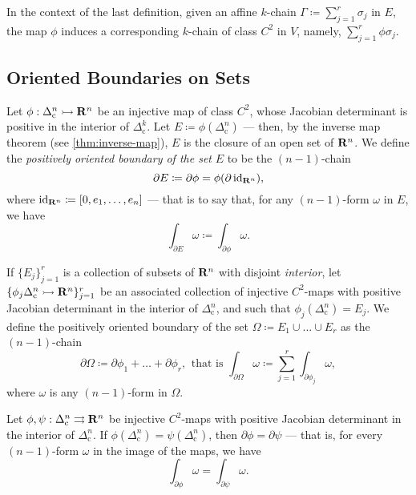 In the context of the last definition, given an affine \(k\)-chain \(\Gamma
\coloneq \sum_{j=1}^r \sigma_j\) in \(E\), the map \(\phi\) induces a
corresponding \(k\)-chain of class \(C^2\) in \(V\), namely, \(\sum_{j=1}^r \phi
\sigma_j\).

\subsection{Oriented Boundaries on Sets}

\begin{definition}
    \label{def:positively-oriented-boundary-on-sets}
    Let \(\phi: \Delta_{\text{c}}^n \rightarrowtail \mathbf{R}^n\) be an injective map of class
    \(C^2\), whose Jacobian determinant is positive in the interior of
    \(\Delta_{\text{c}}^k\). Let \(E \coloneq \phi(\Delta_{\text{c}}^n)\) --- then,
    by the inverse map theorem (see \cref{thm:inverse-map}), \(E\) is the closure of
    an open set of \(\mathbf{R}^n\). We define the \emph{positively oriented boundary of
        the set} \(E\) to be the \((n-1)\)-chain
    \[
        \partial E \coloneq \partial \phi = \phi(\partial \operatorname{id}_{\mathbf{R}^n}),
    \]
    where \(\operatorname{id}_{\mathbf{R}^n} \coloneq [0, e_1, \dots, e_n]\) --- that is to say that, for
    any \((n-1)\)-form \(\omega\) in \(E\), we have
    \[
        \int_{\partial E} \omega \coloneq \int_{\partial \phi} \omega.
    \]

    If \(\{E_{j}\}_{j=1}^r\) is a collection of subsets of \(\mathbf{R}^n\) with disjoint
    \emph{interior}, let
    \(\{\phi_{j} \relax \Delta_{\text{c}}^n \rightarrowtail \mathbf{R}^n\}_{j=1}^r\) be an associated
    collection of injective \(C^2\)-maps with positive Jacobian determinant in the
    interior of \(\Delta_{\text{c}}^n\), and such that
    \(\phi_j(\Delta_{\text{c}}^n) = E_j\). We define the positively oriented
    boundary of the set \(\Omega \coloneq E_1 \cup \dots \cup E_r\) as the
    \((n-1)\)-chain
    \[
        \partial \Omega \coloneq \partial \phi_1 + \dots + \partial \phi_{r}
        \text{,}\ \text{ that is }
        \int_{\partial \Omega} \omega \coloneq \sum_{j=1}^r \int_{\partial \phi_j} \omega,
    \]
    where \(\omega\) is any \((n-1)\)-form in \(\Omega\).
\end{definition}

\begin{proposition}
    \label{prop:same-boundary-same-integral-over-form}
    Let \(\phi, \psi: \Delta_{\text{c}}^n \rightrightarrows \mathbf{R}^n\) be injective
    \(C^2\)-maps with positive Jacobian determinant in the interior of
    \(\Delta_{\text{c}}^n\). If \(\phi(\Delta_{\text{c}}^n) =
    \psi(\Delta_{\text{c}}^n)\), then \(\partial \phi = \partial \psi\) --- that is,
    for every \((n-1)\)-form \(\omega\) in the image of the maps, we have
    \[
        \int_{\partial \phi} \omega = \int_{\partial \psi} \omega.
    \]
\end{proposition}

